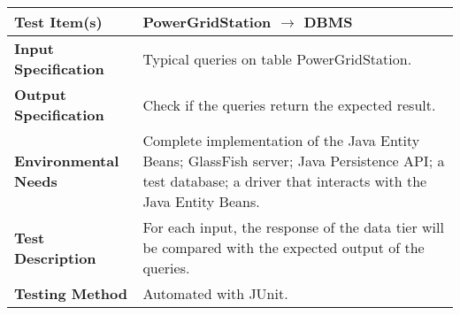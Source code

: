 \begin{tabular}{l p{}}
    \hline
    \textbf{Test Item(s)} & PowerGridStation $\rightarrow$ DBMS \\
    \hline
    \textbf{Input Specification} & Typical queries on table PowerGridStation. \\
    \hline
    \hline
    \textbf{Output Specification} & Check if the queries return the expected result. \\
    \hline
    \textbf{Environmental Needs} & Complete implementation of the Java Entity Beans; GlassFish server; Java Persistence API; a test database; a driver that interacts with the Java Entity Beans.\\
    \hline
    \textbf{Test Description} & For each input, the response of the data tier will be compared with the expected output of the queries.\\
    \hline
    \textbf{Testing Method} & Automated with JUnit. \\
    \hline
\end{tabular}